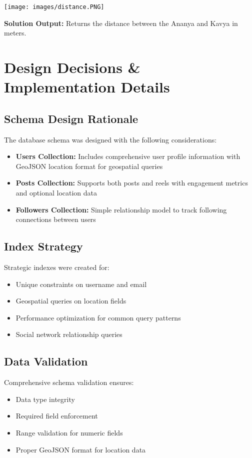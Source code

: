\documentclass[12pt,a4paper]{article}
\begin{document}
\begin{center}
\texttt{[image: images/distance.PNG]}
\end{center}
\textbf{Solution Output:} Returns the distance between the Ananya and Kavya in meters.


\section{Design Decisions \& Implementation Details}
\subsection{Schema Design Rationale}
The database schema was designed with the following considerations:

\begin{itemize}
    \item \textbf{Users Collection:} Includes comprehensive user profile information with GeoJSON location format for geospatial queries
    \item \textbf{Posts Collection:} Supports both posts and reels with engagement metrics and optional location data
    \item \textbf{Followers Collection:} Simple relationship model to track following connections between users
\end{itemize}

\subsection{Index Strategy}
Strategic indexes were created for:
\begin{itemize}
    \item Unique constraints on username and email
    \item Geospatial queries on location fields
    \item Performance optimization for common query patterns
    \item Social network relationship queries
\end{itemize}

\subsection{Data Validation}
Comprehensive schema validation ensures:
\begin{itemize}
    \item Data type integrity
    \item Required field enforcement
    \item Range validation for numeric fields
    \item Proper GeoJSON format for location data
\end{itemize}
\end{document}

